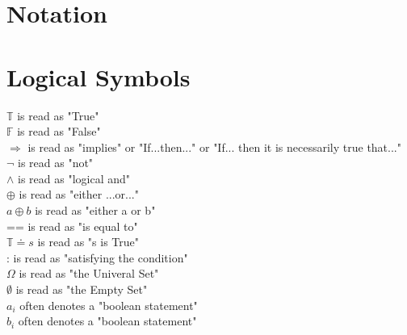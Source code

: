 \documentclass[11pt]{article}
\begin{document}
\section*{Notation}







\section*{Logical Symbols}
$\mathbb{T}$ is read as "True"\\
$\mathbb{F}$ is read as "False"\\
$\Rightarrow$ is read as "implies" or "If...then..." or "If... then it is necessarily true that..."\\
$\lnot$ is read as "not"\\
$\land$ is read as "logical and"\\
$\oplus$ is read as "either ...or..."\\
$a \oplus b$ is read as "either a or b"\\
== is read as "is equal to"\\
$\mathbb{T} \doteq s $ is read as "s is True"\\
: is read as "satisfying the condition"\\
$\Omega$ is read as "the Univeral Set"\\
$\emptyset$ is read as "the Empty Set"\\
$a_i$ often denotes a "boolean statement"\\
$b_i$ often denotes a "boolean statement"\\
\end{document}
